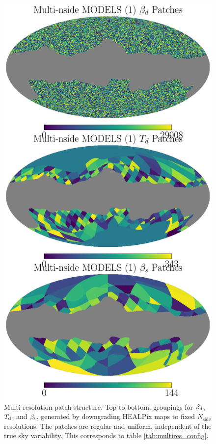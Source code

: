 \documentclass[fleqn,usenatbib]{mnras}
\begin{document}
\begin{figure}
    \centering
    \includegraphics[width=\linewidth]{figures/multires_patch_layout.pdf}
    \caption{
    Multi-resolution patch structure.
    Top to bottom: groupings for \( \beta_{\rm d} \), \( T_{\rm d} \), and \( \beta_{\rm s} \), generated by downgrading HEALPix maps to fixed \( N_{\text{side}} \) resolutions.
    The patches are regular and uniform, independent of the true sky variability.
    This corresponds to table \ref{tab:multires_config}.
    }
    \label{fig:multires_patches}
\end{figure}
\end{document}
